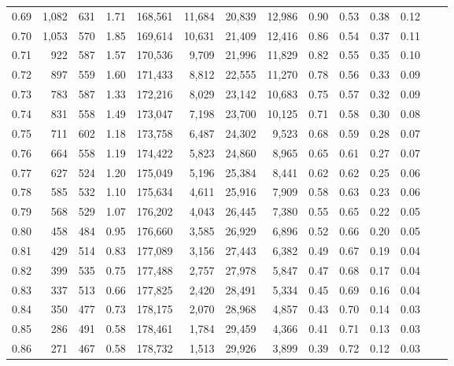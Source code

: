 \begin{tabular}{rrrrrrrrrrrrrr}
0.69 &  1,082 &  631 &    1.71 &  168,561 &   11,684 &  20,839 &  12,986 &  0.90 &  0.53 &  0.38 &      0.12 \\
0.70 &  1,053 &  570 &    1.85 &  169,614 &   10,631 &  21,409 &  12,416 &  0.86 &  0.54 &  0.37 &      0.11 \\
0.71 &    922 &  587 &    1.57 &  170,536 &    9,709 &  21,996 &  11,829 &  0.82 &  0.55 &  0.35 &      0.10 \\
0.72 &    897 &  559 &    1.60 &  171,433 &    8,812 &  22,555 &  11,270 &  0.78 &  0.56 &  0.33 &      0.09 \\
0.73 &    783 &  587 &    1.33 &  172,216 &    8,029 &  23,142 &  10,683 &  0.75 &  0.57 &  0.32 &      0.09 \\
0.74 &    831 &  558 &    1.49 &  173,047 &    7,198 &  23,700 &  10,125 &  0.71 &  0.58 &  0.30 &      0.08 \\
0.75 &    711 &  602 &    1.18 &  173,758 &    6,487 &  24,302 &   9,523 &  0.68 &  0.59 &  0.28 &      0.07 \\
0.76 &    664 &  558 &    1.19 &  174,422 &    5,823 &  24,860 &   8,965 &  0.65 &  0.61 &  0.27 &      0.07 \\
0.77 &    627 &  524 &    1.20 &  175,049 &    5,196 &  25,384 &   8,441 &  0.62 &  0.62 &  0.25 &      0.06 \\
0.78 &    585 &  532 &    1.10 &  175,634 &    4,611 &  25,916 &   7,909 &  0.58 &  0.63 &  0.23 &      0.06 \\
0.79 &    568 &  529 &    1.07 &  176,202 &    4,043 &  26,445 &   7,380 &  0.55 &  0.65 &  0.22 &      0.05 \\
0.80 &    458 &  484 &    0.95 &  176,660 &    3,585 &  26,929 &   6,896 &  0.52 &  0.66 &  0.20 &      0.05 \\
0.81 &    429 &  514 &    0.83 &  177,089 &    3,156 &  27,443 &   6,382 &  0.49 &  0.67 &  0.19 &      0.04 \\
0.82 &    399 &  535 &    0.75 &  177,488 &    2,757 &  27,978 &   5,847 &  0.47 &  0.68 &  0.17 &      0.04 \\
0.83 &    337 &  513 &    0.66 &  177,825 &    2,420 &  28,491 &   5,334 &  0.45 &  0.69 &  0.16 &      0.04 \\
0.84 &    350 &  477 &    0.73 &  178,175 &    2,070 &  28,968 &   4,857 &  0.43 &  0.70 &  0.14 &      0.03 \\
0.85 &    286 &  491 &    0.58 &  178,461 &    1,784 &  29,459 &   4,366 &  0.41 &  0.71 &  0.13 &      0.03 \\
0.86 &    271 &  467 &    0.58 &  178,732 &    1,513 &  29,926 &   3,899 &  0.39 &  0.72 &  0.12 &      0.03 \\

\end{tabular}
